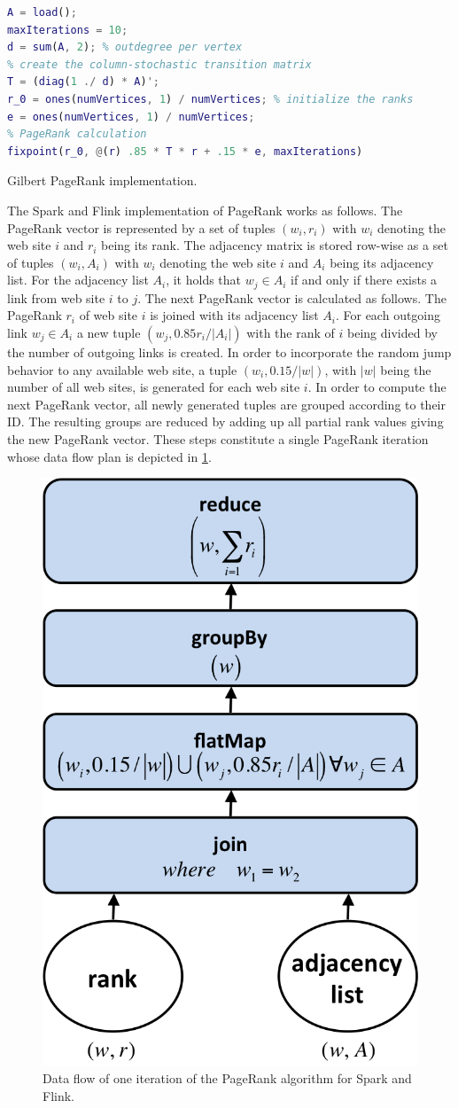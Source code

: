 \begin{listing}[!h]
	\begin{CenteredBox}
		\begin{lstlisting}[language=Matlab,
		commentstyle=\color{black},
		  stringstyle=\color{black},
		  keywordstyle=\color{black}\bfseries,
		  morekeywords={ones, fixpoint},]
% load adjacency matrix
A = load();
maxIterations = 10;
d = sum(A, 2); % outdegree per vertex
% create the column-stochastic transition matrix
T = (diag(1 ./ d) * A)'; 
r_0 = ones(numVertices, 1) / numVertices; % initialize the ranks
e = ones(numVertices, 1) / numVertices;
% PageRank calculation
fixpoint(r_0, @(r) .85 * T * r + .15 * e, maxIterations)
		\end{lstlisting}
	\end{CenteredBox}
	\caption{Gilbert PageRank implementation.}
	\label{lst:gilbertPageRank}
\end{listing}

The Spark and Flink implementation of PageRank works as follows.
The PageRank vector is represented by a set of tuples $(w_i, r_i)$ with $w_i$ denoting the web site $i$ and $r_i$ being its rank.
The adjacency matrix is stored row-wise as a set of tuples $(w_i, A_i)$ with $w_i$ denoting the web site $i$ and $A_i$ being its adjacency list.
For the adjacency list $A_i$, it holds that $w_j \in A_i$ if and only if there exists a link from web site $i$ to $j$.
The next PageRank vector is calculated as follows.
The PageRank $r_i$ of web site $i$ is joined with its adjacency list $A_i$.
For each outgoing link $w_j \in A_i$ a new tuple $(w_j, 0.85r_i/\left|A_i\right|)$ with the rank of $i$ being divided by the number of outgoing links is created.
In order to incorporate the random jump behavior to any available web site, a tuple $(w_i, 0.15/|w|)$, with $|w|$ being the number of all web sites, is generated for each web site $i$.
In order to compute the next PageRank vector, all newly generated tuples are grouped according to their ID.
The resulting groups are reduced by adding up all partial rank values giving the new PageRank vector.
These steps constitute a single PageRank iteration whose data flow plan is depicted in \cref{fig:pageRankDataFlow}.

\begin{figure}[!h]
	\centering
	\includegraphics[width=.3\linewidth]{images/pageRankStep.png}
	\caption{Data flow of one iteration of the PageRank algorithm for Spark and Flink.}
	\label{fig:pageRankDataFlow}
\end{figure}

